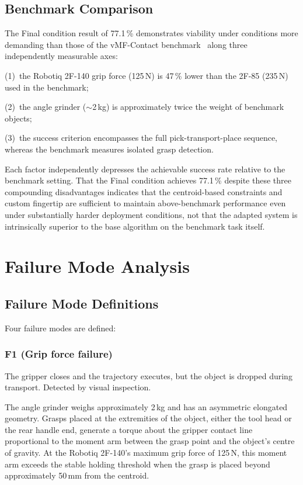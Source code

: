 \documentclass[12pt, a4paper]{report}
\begin{document}
\subsection{Benchmark Comparison}
\label{sec:benchmark-comparison}

The Final condition result of 77.1\,\% demonstrates viability under conditions more demanding than those of the vMF-Contact benchmark~\cite{shi2025} along three independently measurable axes:

(1)~the Robotiq 2F-140 grip force (125\,N) is 47\,\% lower than the 2F-85 (235\,N) used in the benchmark; 

(2)~the angle grinder ($\sim$2\,kg) is approximately twice the weight of benchmark objects; 

(3)~the success criterion encompasses the full pick-transport-place sequence, whereas the benchmark measures isolated grasp detection. 

Each factor independently depresses the achievable success rate relative to the benchmark setting. 
That the Final condition achieves 77.1\,\% despite these three compounding disadvantages indicates that the centroid-based constraints and custom fingertip are sufficient to maintain above-benchmark performance even under substantially harder deployment conditions, not that the adapted system is intrinsically superior to the base algorithm on the benchmark task itself.

\section{Failure Mode Analysis}
\label{sec:failure-mode-analysis}

\subsection{Failure Mode Definitions}
\label{sec:failure-mode-definitions}

Four failure modes are defined:

\subsubsection{F1 (Grip force failure)}
The gripper closes and the trajectory executes, but the object is dropped during transport. Detected by visual inspection.

The angle grinder weighs approximately 2\,kg and has an asymmetric elongated geometry. Grasps placed at the extremities of the object, either the tool head or the rear handle end, generate a torque about the gripper contact line proportional to the moment arm between the grasp point and the object's centre of gravity. At the Robotiq 2F-140's maximum grip force of 125\,N, this moment arm exceeds the stable holding threshold when the grasp is placed beyond approximately 50\,mm from the centroid.
\end{document}
